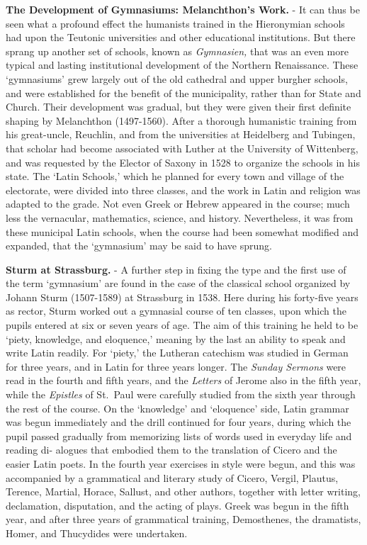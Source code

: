 \documentclass[
]{book}
\begin{document}
\textbf{The Development of Gymnasiums: Melanchthon's Work.} - It can thus be seen what a profound effect the humanists trained in the Hieronymian schools had upon the Teutonic universities and other educational institutions. But there sprang up another set of schools, known as \emph{Gymnasien,} that was an even more typical and lasting institutional development of the Northern Renaissance. These `gymnasiums' grew largely out of the old cathedral and upper burgher schools, and were established for the benefit of the municipality, rather than for State and Church. Their development was gradual, but they were given their first definite shaping by Melanchthon (1497-1560). After a thorough humanistic training from his great-uncle, Reuchlin, and from the universities at Heidelberg and Tubingen, that scholar had become associated with Luther at the University of Wittenberg, and was requested by the Elector of Saxony in 1528 to organize the schools in his state. The `Latin Schools,' which he planned for every town and village of the electorate, were divided into three classes, and the work in Latin and religion was adapted to the grade. Not even Greek or Hebrew appeared in the course; much less the vernacular, mathematics, science, and history. Nevertheless, it was from these municipal Latin schools, when the course had been somewhat modified and expanded, that the `gymnasium' may be said to have sprung.

\textbf{Sturm at Strassburg.} - A further step in fixing the type and the first use of the term `gymnasium' are found in the case of the classical school organized by Johann Sturm (1507-1589) at Strassburg in 1538. Here during his forty-five years as rector, Sturm worked out a gymnasial course of ten classes, upon which the pupils entered at six or seven years of age. The aim of this training he held to be `piety, knowledge, and eloquence,' meaning by the last an ability to speak and write Latin readily. For `piety,' the Lutheran catechism was studied in German for three years, and in Latin for three years longer. The \emph{Sunday Sermons} were read in the fourth and fifth years, and the \emph{Letters} of Jerome also in the fifth year, while the \emph{Epistles} of St.~Paul were carefully studied from the sixth year through the rest of the course. On the `knowledge' and `eloquence' side, Latin grammar was begun immediately and the drill continued for four years, during which the pupil passed gradually from memorizing lists of words used in everyday life and reading di- alogues that embodied them to the translation of Cicero and the easier Latin poets. In the fourth year exercises in style were begun, and this was accompanied by a grammatical and literary study of Cicero, Vergil, Plautus, Terence, Martial, Horace, Sallust, and other authors, together with letter writing, declamation, disputation, and the acting of plays. Greek was begun in the fifth year, and after three years of grammatical training, Demosthenes, the dramatists, Homer, and Thucydides were undertaken.
\end{document}
